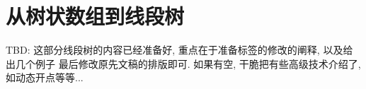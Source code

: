 \part{从树状数组到线段树}

TBD: 这部分线段树的内容已经准备好, 重点在于准备标签的修改的阐释, 以及给出几个例子
最后修改原先文稿的排版即可. 
如果有空, 干脆把有些高级技术介绍了, 如动态开点等等... 